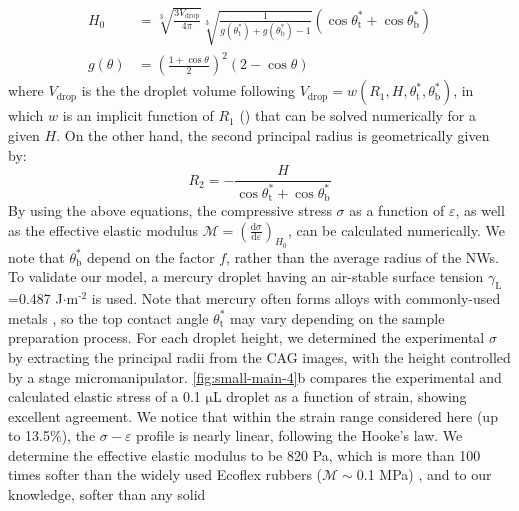   \begin{equation}
  \label{eq:small-H0}
  \begin{aligned}
    H_{0} &= \sqrt[3]{\frac{3 V_{\mathrm{drop}}}{4 \pi}} \sqrt[3]{\frac{1}{ 
   g(\theta_{\mathrm{t}}^{*}) + g(\theta_{\mathrm{b}}^{*}) -1 }}  \left(\cos \theta_{\mathrm{t}}^{*} + \cos \theta_{\mathrm{b}}^{*
}\right) \\
    g(\theta) &= \left(\frac{1 + \cos \theta}{2} \right)^{2} \left(2 - \cos \theta \right)
  \end{aligned}
  \end{equation}
where \(V_{\mathrm{drop}}\) is the the droplet volume following
\(V_{\mathrm{drop}} = w(R_{1}, H, \theta_{\mathrm{t}}^{*},
  \theta_{\mathrm{b}}^{*})\), in which \(w\) is an implicit function of
\(R_{1}\) () that can be solved
numerically for a given \(H\). On the other hand, the second principal
radius is geometrically given by:
\begin{equation}
\label{eq:small-1}
R_{2} = -\frac{H}{\cos \theta_{\mathrm{t}}^{*} + \cos \theta_{\mathrm{b}}^{*}}
\end{equation}
By using the above equations, the compressive stress \(\sigma\) as a
function of \(\varepsilon\), as well as the effective elastic modulus
\(\mathscr{M} = \left({\displaystyle \frac{\mathrm{d} \sigma}{\mathrm{d}
  \varepsilon}}\right)_{H_{0}}\), can be calculated numerically. We
note that \(\theta^{*}_{\mathrm{b}}\) depend on the factor \(f\), rather
than the average radius of the NWs.  To validate our model, a
mercury droplet having an air-stable surface tension
\(\gamma_{\mathrm{L}}\)=0.487 J\(\cdot\)m\(^{\text{-2}}\) is used. Note that
mercury often forms alloys with commonly-used metals
\cite{Kieffer_1959}, so the top contact angle
\(\theta_{\mathrm{t}}^{*}\) may vary depending on the sample
preparation process. For each droplet height, we determined the
experimental \(\sigma\) by extracting the principal radii from the CAG
images, with the height controlled by a stage
micromanipulator.  \autoref{fig:small-main-4}b compares the experimental
and calculated elastic stress of a 0.1 \(\mathrm{\mu}\)L droplet as
a function of strain, showing excellent agreement. We notice that
within the strain range considered here (up to 13.5\%), the \(\sigma -
  \varepsilon\) profile is nearly linear, following the Hooke's law. We
determine the effective elastic modulus to be 820 Pa, which is more
than 100 times softer than the widely used Ecoflex rubbers
(\(\mathscr{M}\sim{}\)0.1 MPa) \cite{Mosadegh_2014_soft_robot}, and to our knowledge, softer than any solid

